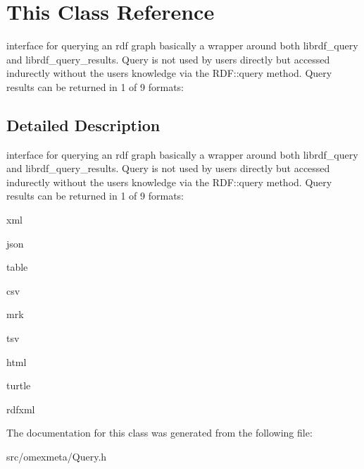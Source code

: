 \hypertarget{classThis}{}\section{This Class Reference}
\label{classThis}


interface for querying an rdf graph basically a wrapper around both librdf\+\_\+query and librdf\+\_\+query\+\_\+results. Query is not used by users directly but accessed indurectly without the users knowledge via the R\+D\+F\+::query method. Query results can be returned in 1 of 9 formats\+:  




\subsection{Detailed Description}
interface for querying an rdf graph basically a wrapper around both librdf\+\_\+query and librdf\+\_\+query\+\_\+results. Query is not used by users directly but accessed indurectly without the users knowledge via the R\+D\+F\+::query method. Query results can be returned in 1 of 9 formats\+: 


\begin{DoxyItemize}
\item xml
\item json
\item table
\item csv
\item mrk
\item tsv
\item html
\item turtle
\item rdfxml 
\end{DoxyItemize}

The documentation for this class was generated from the following file\+:\begin{DoxyCompactItemize}
\item 
src/omexmeta/Query.\+h\end{DoxyCompactItemize}
